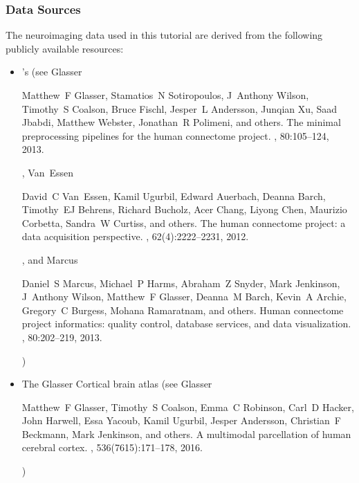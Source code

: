 \documentclass[letterpaper,10pt,english]{jupyterBook}
\begin{document}
\subsubsection{Data Sources}
\label{\detokenize{chapters/03/03c_visualization-examples:data-sources}}
\sphinxAtStartPar
The neuroimaging data used in this tutorial are derived from the following publicly available resources:
\begin{itemize}
\item {} 
\sphinxAtStartPar
{}’s  (see Glasser %
\begin{footnote}[1]\sphinxAtStartFootnote
Matthew F Glasser, Stamatios N Sotiropoulos, J Anthony Wilson, Timothy S Coalson, Bruce Fischl, Jesper L Andersson, Junqian Xu, Saad Jbabdi, Matthew Webster, Jonathan R Polimeni, and others. The minimal preprocessing pipelines for the human connectome project. , 80:105–124, 2013.
%
\end{footnote}, Van Essen %
\begin{footnote}[2]\sphinxAtStartFootnote
David C Van Essen, Kamil Ugurbil, Edward Auerbach, Deanna Barch, Timothy EJ Behrens, Richard Bucholz, Acer Chang, Liyong Chen, Maurizio Corbetta, Sandra W Curtiss, and others. The human connectome project: a data acquisition perspective. , 62(4):2222–2231, 2012.
%
\end{footnote}, and Marcus %
\begin{footnote}[3]\sphinxAtStartFootnote
Daniel S Marcus, Michael P Harms, Abraham Z Snyder, Mark Jenkinson, J Anthony Wilson, Matthew F Glasser, Deanna M Barch, Kevin A Archie, Gregory C Burgess, Mohana Ramaratnam, and others. Human connectome project informatics: quality control, database services, and data visualization. , 80:202–219, 2013.
%
\end{footnote})

\item {} 
\sphinxAtStartPar
The Glasser Cortical brain atlas (see Glasser %
\begin{footnote}[4]\sphinxAtStartFootnote
Matthew F Glasser, Timothy S Coalson, Emma C Robinson, Carl D Hacker, John Harwell, Essa Yacoub, Kamil Ugurbil, Jesper Andersson, Christian F Beckmann, Mark Jenkinson, and others. A multi\sphinxhyphen{}modal parcellation of human cerebral cortex. , 536(7615):171–178, 2016.
%
\end{footnote})


\end{itemize}
\end{document}
